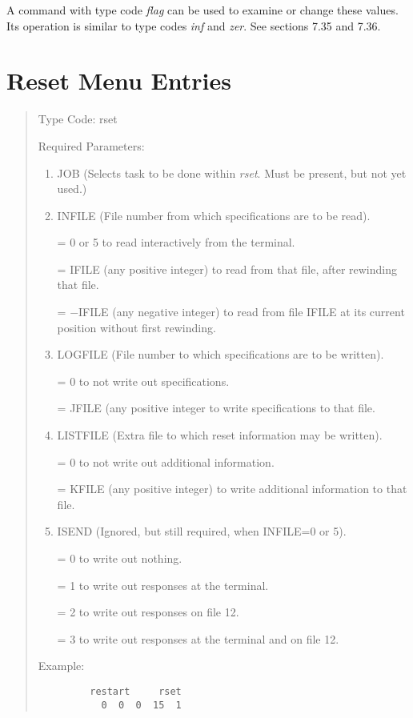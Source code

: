 \vspace{5mm}
\noindent A command with type code {\em flag} can be used to examine or change these values.  Its operation is similar to type codes {\em inf} and {\em zer}.  See sections 7.35 and 7.36.

\newpage
\section{Reset Menu Entries} 
\begin{quotation}
\noindent     Type Code:  rset
\vspace{5mm}

\noindent Required Parameters:
\begin{enumerate}
        \item  JOB (Selects task to be done within {\em rset}.  Must be
		present, but not yet used.)

        \item  INFILE (File number from which specifications are to be
		read).

              = 0 or 5 to read interactively from the terminal.

              = IFILE (any positive integer) to read from that file,
			  after rewinding that \hspace*{1em}file.

              = $-$IFILE (any negative integer) to read from file IFILE at
			  its current \hspace*{1em}position without first rewinding.

        \item  LOGFILE (File number to which specifications are to be
		written).

              = 0 to not write out specifications.

              = JFILE (any positive integer to write specifications to
			  that file.

        \item  LISTFILE (Extra file to which reset information may be written).

              = 0 to not write out additional information.

              = KFILE (any positive integer) to write additional
			  information to that file.

        \item  ISEND (Ignored, but still required, when INFILE=0 or 5).

              = 0 to write out nothing.

              = 1 to write out responses at the terminal.

              = 2 to write out responses on file 12.

              = 3 to write out responses at the terminal and on file 12.

\end{enumerate}
\vspace{5mm}
\noindent Example:
\begin{verbatim}
         restart     rset
           0  0  0  15  1
\end{verbatim}
\end{quotation}
